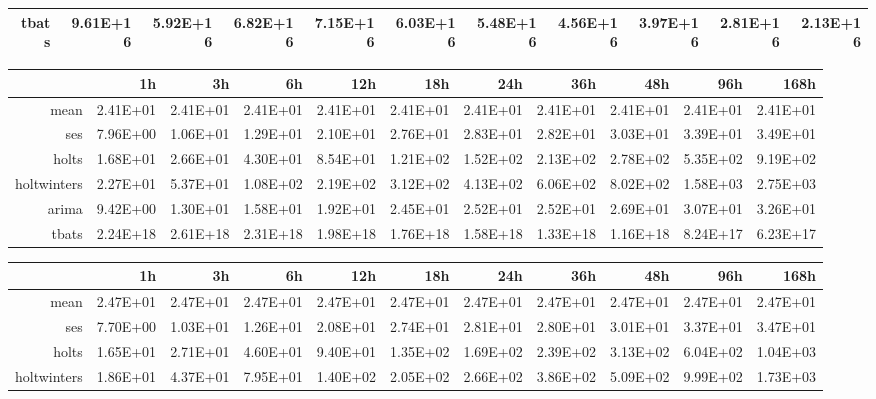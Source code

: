 \begin{landscape}
\begin{table}[ht]
\begin{tabular}{rrrrrrrrrrr}
  tbats & 9.61E+16 & 5.92E+16 & 6.82E+16 & 7.15E+16 & 6.03E+16 & 5.48E+16 & 4.56E+16 & 3.97E+16 & 2.81E+16 & 2.13E+16 \\ 
   \hline
\end{tabular}
\end{table}
\begin{table}[ht]
\centering
\begin{tabular}{rrrrrrrrrrr}
  \hline
 & 1h & 3h & 6h & 12h & 18h & 24h & 36h & 48h & 96h & 168h \\ 
  \hline
mean & 2.41E+01 & 2.41E+01 & 2.41E+01 & 2.41E+01 & 2.41E+01 & 2.41E+01 & 2.41E+01 & 2.41E+01 & 2.41E+01 & 2.41E+01 \\ 
  ses & 7.96E+00 & 1.06E+01 & 1.29E+01 & 2.10E+01 & 2.76E+01 & 2.83E+01 & 2.82E+01 & 3.03E+01 & 3.39E+01 & 3.49E+01 \\ 
  holts & 1.68E+01 & 2.66E+01 & 4.30E+01 & 8.54E+01 & 1.21E+02 & 1.52E+02 & 2.13E+02 & 2.78E+02 & 5.35E+02 & 9.19E+02 \\ 
  holtwinters & 2.27E+01 & 5.37E+01 & 1.08E+02 & 2.19E+02 & 3.12E+02 & 4.13E+02 & 6.06E+02 & 8.02E+02 & 1.58E+03 & 2.75E+03 \\ 
  arima & 9.42E+00 & 1.30E+01 & 1.58E+01 & 1.92E+01 & 2.45E+01 & 2.52E+01 & 2.52E+01 & 2.69E+01 & 3.07E+01 & 3.26E+01 \\ 
  tbats & 2.24E+18 & 2.61E+18 & 2.31E+18 & 1.98E+18 & 1.76E+18 & 1.58E+18 & 1.33E+18 & 1.16E+18 & 8.24E+17 & 6.23E+17 \\ 
   \hline
\end{tabular}
\end{table}
\begin{table}[ht]
\centering
\begin{tabular}{rrrrrrrrrrr}
  \hline
 & 1h & 3h & 6h & 12h & 18h & 24h & 36h & 48h & 96h & 168h \\ 
  \hline
mean & 2.47E+01 & 2.47E+01 & 2.47E+01 & 2.47E+01 & 2.47E+01 & 2.47E+01 & 2.47E+01 & 2.47E+01 & 2.47E+01 & 2.47E+01 \\ 
  ses & 7.70E+00 & 1.03E+01 & 1.26E+01 & 2.08E+01 & 2.74E+01 & 2.81E+01 & 2.80E+01 & 3.01E+01 & 3.37E+01 & 3.47E+01 \\ 
  holts & 1.65E+01 & 2.71E+01 & 4.60E+01 & 9.40E+01 & 1.35E+02 & 1.69E+02 & 2.39E+02 & 3.13E+02 & 6.04E+02 & 1.04E+03 \\ 
  holtwinters & 1.86E+01 & 4.37E+01 & 7.95E+01 & 1.40E+02 & 2.05E+02 & 2.66E+02 & 3.86E+02 & 5.09E+02 & 9.99E+02 & 1.73E+03 \\ 

\end{tabular}
\end{table}
\end{landscape}
